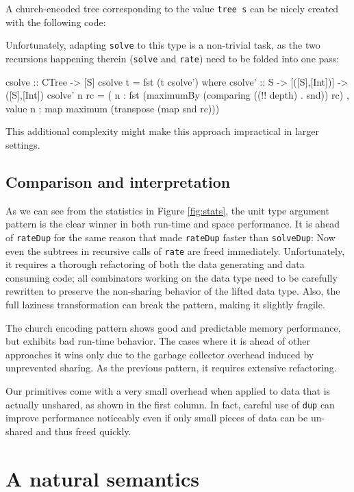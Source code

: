 \documentclass[preprint]{sigplanconf}
\theoremstyle{nonumberplain}
\newcommand{\li}{\lstinline[style=Haskell]}
\begin{document}
A church-encoded tree corresponding to the value \li-tree s- can be nicely created with the following code:

Unfortunately, adapting \li-solve- to this type is a non-trivial task, as the two recursions happening therein (\li-solve- and \li-rate-) need to be folded into one pass:
\begin{haskell}
csolve :: CTree -> [S]
csolve t = fst (t csolve')
  where
  csolve' :: S -> [([S],[Int])] -> ([S],[Int])
  csolve' n rc = 
    ( n : fst (maximumBy (comparing ((!! depth) . snd)) rc)
    , value n : map maximum (transpose (map snd rc)))
\end{haskell}
This additional complexity might make this approach impractical in larger settings.

\subsection{Comparison and interpretation}

As we can see from the statistics in Figure \ref{fig:stats}, the unit type argument pattern is the clear winner in both run-time and space performance. It is ahead of \li-rateDup- for the same reason that made \li-rateDup- faster than \li-solveDup-: Now even the subtrees in recursive calls of \li-rate- are freed immediately.
Unfortunately, it requires a thorough refactoring of both the data generating and data consuming code; all combinators working on the data type need to be carefully rewritten to preserve the non-sharing behavior of the lifted data type. Also, the full laziness transformation can break the pattern, making it slightly fragile.

The church encoding pattern shows good and predictable memory performance, but exhibits bad run-time behavior. The cases where it is ahead of other approaches it wins only due to the garbage collector overhead induced by unprevented sharing. As the previous pattern, it requires extensive refactoring.

Our primitives come with a very small overhead when applied to data that is actually unshared, as shown in the first column. In fact, careful use of \li-dup- can improve performance noticeably even if only small pieces of data can be un-shared and thus freed quickly.

\section{A natural semantics}
\label{sec:semantics}
\end{document}

